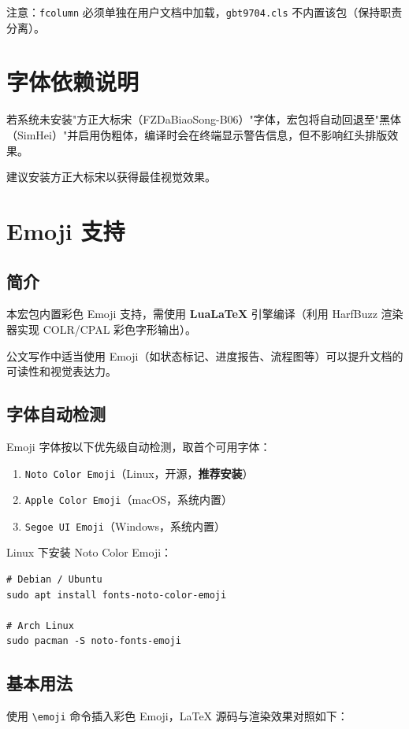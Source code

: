 \documentclass[redline, titleindent, zhlineskip]{gbt9704}
\begin{document}
注意：\texttt{fcolumn} 必须单独在用户文档中加载，\texttt{gbt9704.cls} 不内置该包（保持职责分离）。

\section{字体依赖说明}
若系统未安装"方正大标宋（FZDaBiaoSong-B06）"字体，宏包将自动回退至"黑体（SimHei）"并启用伪粗体，编译时会在终端显示警告信息，但不影响红头排版效果。

建议安装方正大标宋以获得最佳视觉效果。

\section{Emoji 支持}

\subsection{简介}
本宏包内置彩色 Emoji 支持，需使用 \textbf{LuaLaTeX} 引擎编译（利用 HarfBuzz 渲染器实现 COLR/CPAL 彩色字形输出）。

公文写作中适当使用 Emoji（如状态标记、进度报告、流程图等）可以提升文档的可读性和视觉表达力。

\subsection{字体自动检测}
Emoji 字体按以下优先级自动检测，取首个可用字体：
\begin{enumerate}
  \item \texttt{Noto Color Emoji}（Linux，开源，\textbf{推荐安装}）
  \item \texttt{Apple Color Emoji}（macOS，系统内置）
  \item \texttt{Segoe UI Emoji}（Windows，系统内置）
\end{enumerate}

Linux 下安装 Noto Color Emoji：
\begin{verbatim}
# Debian / Ubuntu
sudo apt install fonts-noto-color-emoji

# Arch Linux
sudo pacman -S noto-fonts-emoji
\end{verbatim}

\subsection{基本用法}

使用 \verb|\emoji| 命令插入彩色 Emoji，LaTeX 源码与渲染效果对照如下：
\end{document}
